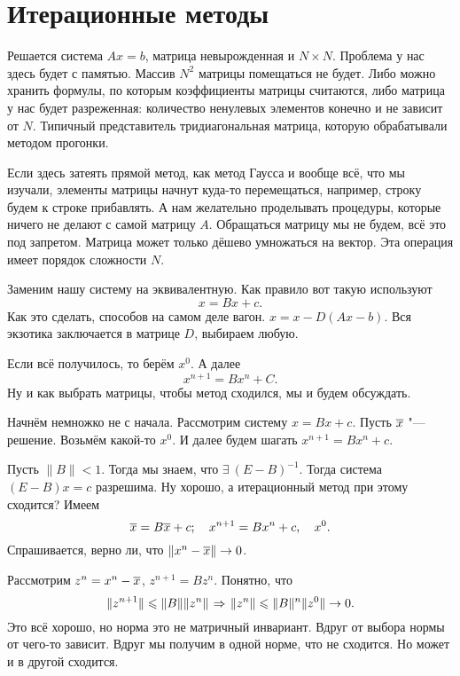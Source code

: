\section{Итерационные методы}
Решается система $Ax = b$, матрица невырожденная и $N\times N$. Проблема у нас здесь будет с памятью. Массив $N^2$ матрицы помещаться не будет. Либо можно хранить формулы, по которым коэффициенты матрицы считаются, либо матрица у нас будет разреженная: количество ненулевых элементов конечно и не зависит от $N$. Типичный представитель тридиагональная матрица, которую обрабатывали методом прогонки. 

Если здесь затеять прямой метод, как метод Гаусса и вообще всё, что мы изучали, элементы матрицы начнут куда-то перемещаться, например, строку будем к строке прибавлять. А нам желательно проделывать процедуры, которые ничего не делают с самой матрицу $A$. Обращаться матрицу мы не будем, всё это под запретом. Матрица может только дёшево умножаться на вектор. Эта операция имеет порядок сложности $N$.

Заменим нашу систему на эквивалентную. Как правило вот такую используют
\[
  x = Bx + c.
\]
Как это сделать, способов на самом деле вагон. $x = x - D(Ax - b)$. Вся экзотика заключается в матрице $D$, выбираем любую.

Если всё получилось, то берём $x^0$. А далее
\[
  x^{n+1} = B x^n + C.
\]
Ну и как выбрать матрицы, чтобы метод сходился, мы и будем обсуждать.

Начнём немножко не с начала. Рассмотрим систему $x = Bx + c$. Пусть $\overline{x}$ "--- решение. Возьмём какой-то $x^0$. И далее будем шагать $x^{n+1} = Bx^n + c$.

Пусть $\|B\|<1$. Тогда мы знаем, что $\exists\ (E-B)^{-1}$. Тогда система $(E-B)x = c$ разрешима. Ну хорошо, а итерационный метод при этому сходится? Имеем
\[
  \overline{x} = B\overline{x} + c;\quad x^{n+1} = B x^n + c,\quad x^0.
\]
Спрашивается, верно ли, что $\|x^n - \overline{x}\|\rightarrow 0$.

Рассмотрим $z^n = x^n - \overline{x}$, $z^{n+1} = Bz^n$. Понятно, что
\[
  \|z^{n+1}\| \leqslant \|B\| \|z^n\|\hspace{1pt plus1pt}\Rightarrow\hspace{1pt plus1pt} \|z^n\| \leqslant \|B\|^n \|z^0\|\rightarrow 0.
\]
Это всё хорошо, но норма это не матричный инвариант. Вдруг от выбора нормы от чего-то зависит. Вдруг мы получим в одной норме, что не сходится. Но может и в другой сходится.

